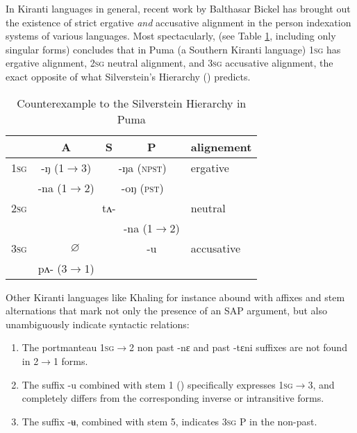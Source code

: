 \documentclass[oldfontcommands,oneside,a4paper,11pt]{article}
\newcommand{\ipa}[1]{{\phon \mbox{#1}}} %
\newcommand{\grise}[1]{\cellcolor{lightgray}\textbf{#1}}
\begin{document}
In Kiranti languages in general, recent work by Balthasar Bickel has brought out the existence of strict ergative \textit{and} accusative alignment in the person indexation systems of various languages. Most spectacularly, \citet{bickel08scope} (see Table \ref{tab:silverstein}, including only singular forms) concludes that in Puma (a Southern Kiranti language) \textsc{1sg} has ergative alignment, \textsc{2sg} neutral alignment, and \textsc{3sg} accusative alignment, the exact opposite of what  Silverstein's Hierarchy (\citealt{silverstein76}) predicts.

\begin{table}[H]
\caption{Counterexample to the Silverstein Hierarchy in Puma} \label{tab:silverstein} \centering
\begin{tabular}{l|c|c|c|l}
\toprule
& A & S & P & alignement\\
\hline
\textsc{1sg}& \ipa{-ŋ} (1$\rightarrow$3)& \multicolumn{2}{|c|}{\ipa{-ŋa} \grise{}(\textsc{npst})}  &ergative\\
 & \ipa{-na} (1$\rightarrow$2)& \multicolumn{2}{|c|}{\ipa{-oŋ} \grise{}(\textsc{pst})} &\\
\hline
 \textsc{2sg} & \multicolumn{3}{c|}{\ipa{tʌ-}}& neutral\\
 \cline{4-4}
 &\multicolumn{2}{c|}{}&\ipa{-na} (1$\rightarrow$2)&\\
 \hline
  \textsc{3sg} & \multicolumn{2}{c|}{$\varnothing$} & \ipa{-u} &accusative\\
   \cline{2-2}
  &\ipa{pʌ-}  (3$\rightarrow$1) & &\\
  \bottomrule
\end{tabular}
\end{table}

Other Kiranti languages like Khaling for instance abound with affixes and stem alternations that mark not only the presence of an SAP argument, but also unambiguously indicate syntactic relations:

\begin{enumerate}
\item The portmanteau \textsc{1sg$\rightarrow$2} non past \ipa{-nɛ} and past \ipa{-tɛni} suffixes are not found in 2$\rightarrow$1 forms.
\item The suffix \ipa{-u}  combined with stem 1 (\citealt[1104]{jacques12khaling}) specifically expresses \textsc{1sg$\rightarrow$3}, and completely differs from the corresponding inverse or intransitive forms.
\item The suffix \ipa{-ʉ}, combined with stem 5, indicates \textsc{3sg} P in the non-past.
\end{enumerate}
\end{document}
